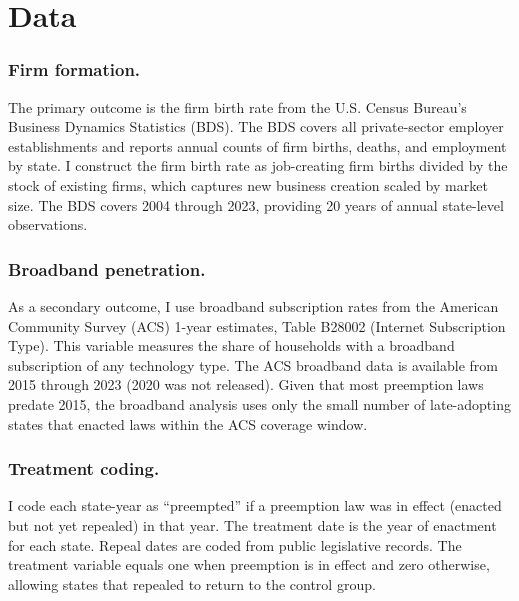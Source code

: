 \documentclass[12pt]{article}
\begin{document}

\section{Data}\label{sec:data}

\subsubsection*{Firm formation.} The primary outcome is the firm birth rate from the U.S. Census Bureau's Business Dynamics Statistics (BDS). The BDS covers all private-sector employer establishments and reports annual counts of firm births, deaths, and employment by state. I construct the firm birth rate as job-creating firm births divided by the stock of existing firms, which captures new business creation scaled by market size. The BDS covers 2004 through 2023, providing 20 years of annual state-level observations.

\subsubsection*{Broadband penetration.} As a secondary outcome, I use broadband subscription rates from the American Community Survey (ACS) 1-year estimates, Table B28002 (Internet Subscription Type). This variable measures the share of households with a broadband subscription of any technology type. The ACS broadband data is available from 2015 through 2023 (2020 was not released). Given that most preemption laws predate 2015, the broadband analysis uses only the small number of late-adopting states that enacted laws within the ACS coverage window.

\subsubsection*{Treatment coding.} I code each state-year as ``preempted'' if a preemption law was in effect (enacted but not yet repealed) in that year. The treatment date is the year of enactment for each state. Repeal dates are coded from public legislative records. The treatment variable equals one when preemption is in effect and zero otherwise, allowing states that repealed to return to the control group.

\end{document}
